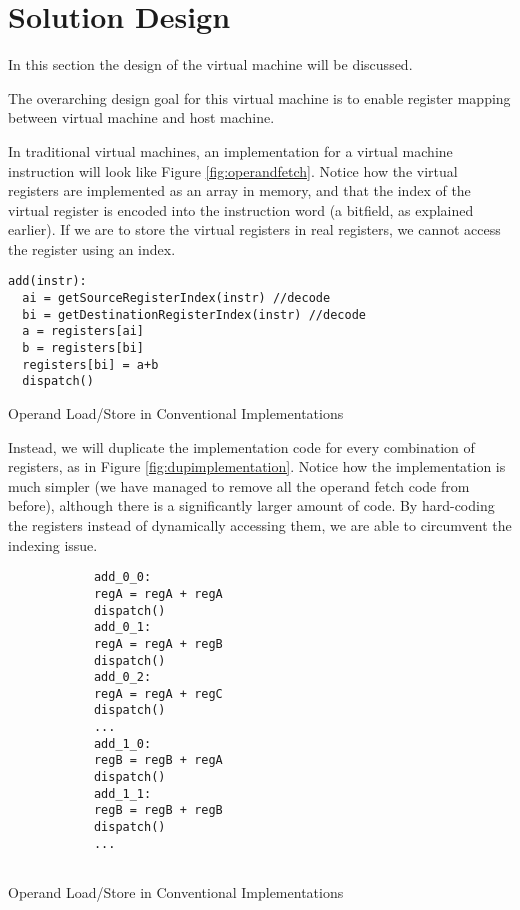 \chapter{Solution Design}
	In this section the design of the virtual machine will be discussed. 
	
	The overarching design goal for this virtual machine is to enable register mapping between virtual machine and host machine.
	
	In traditional virtual machines, an implementation for a virtual machine instruction will look like Figure \ref{fig:operandfetch}. Notice how the virtual registers are implemented as an array in memory, and that the index of the virtual register is encoded into the instruction word (a bitfield, as explained earlier). If we are to store the virtual registers in real registers, we cannot access the register using an index.
	
	\begin{myfigure}
		\begin{lstlisting}
add(instr):
  ai = getSourceRegisterIndex(instr) //decode
  bi = getDestinationRegisterIndex(instr) //decode
  a = registers[ai]
  b = registers[bi]
  registers[bi] = a+b
  dispatch()
		\end{lstlisting}
		\caption{Operand Load/Store in Conventional Implementations}
		\label{fig:operandfetch}
	\end{myfigure}
	
	Instead, we will duplicate the implementation code for every combination of registers, as in Figure \ref{fig:dupimplementation}. Notice how the implementation is much simpler (we have managed to remove all the operand fetch code from before), although there is a significantly larger amount of code. By hard-coding the registers instead of dynamically accessing them, we are able to circumvent the indexing issue.
	
		\begin{myfigure}
			\begin{lstlisting}
			add_0_0:
			regA = regA + regA
			dispatch()
			add_0_1:
			regA = regA + regB
			dispatch()
			add_0_2:
			regA = regA + regC
			dispatch()
			...
			add_1_0:
			regB = regB + regA
			dispatch()
			add_1_1:
			regB = regB + regB
			dispatch()
			...
			
			\end{lstlisting}
			\caption{Operand Load/Store in Conventional Implementations}
			\label{fig:dupimplementation}
		\end{myfigure}
	
